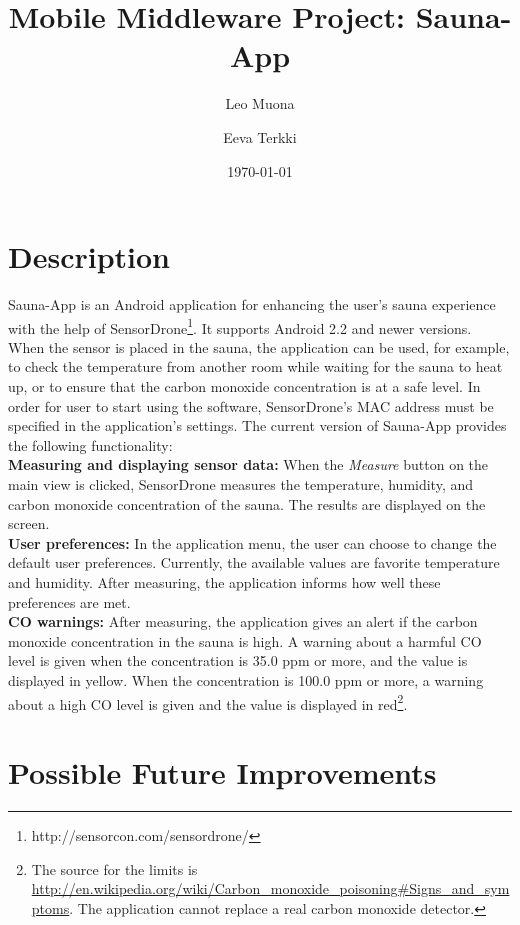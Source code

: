 \documentclass[11pt]{article}
\title{\textbf{Mobile Middleware Project: Sauna-App}}
\author{Leo Muona \and
		Eeva Terkki}
\date{\today}
\begin{document}
\maketitle
\thispagestyle{empty}

\section{Description}

Sauna-App is an Android application for enhancing the user's sauna experience with the help of SensorDrone\footnote{http://sensorcon.com/sensordrone/}. It supports Android 2.2 and newer versions. When the sensor is placed in the sauna, the application can be used, for example, to check the temperature from another room while waiting for the sauna to heat up, or to ensure that the carbon monoxide concentration is at a safe level. In order for user to start using the software, SensorDrone's MAC address must be specified in the application's settings. The current version of Sauna-App provides the following functionality:\\

\noindent\textbf{Measuring and displaying sensor data:} When the \textit{Measure} button on the main view is clicked, SensorDrone measures the temperature, humidity, and carbon monoxide concentration of the sauna. The results are displayed on the screen. \\

\noindent\textbf{User preferences:} In the application menu, the user can choose to change the default user preferences. Currently, the available values are favorite temperature and humidity. After measuring, the application informs how well these preferences are met. \\

\noindent\textbf{CO warnings:} After measuring, the application gives an alert if the carbon monoxide concentration in the sauna is high. A warning about a harmful CO level is given when the concentration is 35.0 ppm or more, and the value is displayed in yellow. When the concentration is 100.0 ppm or more, a warning about a high CO level is given and the value is displayed in red\footnote{The source for the limits is \url{http://en.wikipedia.org/wiki/Carbon_monoxide_poisoning\#Signs_and_symptoms}. The application cannot replace a real carbon monoxide detector.}.

\section{Possible Future Improvements}
\end{document}
